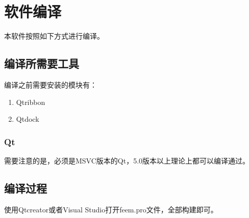 \chapter{软件编译}
本软件按照如下方式进行编译。
\section{编译所需要工具}
编译之前需要安装的模块有：
\begin{enumerate}
	\item Qtribbon
	\item Qtdock
\end{enumerate}
\subsection{Qt}
需要注意的是，必须是MSVC版本的Qt，5.0版本以上理论上都可以编译通过。
\section{编译过程}
使用Qtcreator或者Visual Studio打开feem.pro文件，全部构建即可。